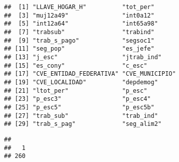 \documentclass[11pt,]{article}
\newenvironment{Shaded}{\begin{snugshade}}{\end{snugshade}}
\newcommand{\KeywordTok}[1]{\textcolor[rgb]{0.13,0.29,0.53}{\textbf{#1}}}
\newcommand{\DataTypeTok}[1]{\textcolor[rgb]{0.13,0.29,0.53}{#1}}
\newcommand{\DecValTok}[1]{\textcolor[rgb]{0.00,0.00,0.81}{#1}}
\newcommand{\StringTok}[1]{\textcolor[rgb]{0.31,0.60,0.02}{#1}}
\newcommand{\CommentTok}[1]{\textcolor[rgb]{0.56,0.35,0.01}{\textit{#1}}}
\newcommand{\OtherTok}[1]{\textcolor[rgb]{0.56,0.35,0.01}{#1}}
\newcommand{\OperatorTok}[1]{\textcolor[rgb]{0.81,0.36,0.00}{\textbf{#1}}}
\newcommand{\NormalTok}[1]{#1}
\begin{document}
\begin{Shaded}
\end{Shaded}

\begin{verbatim}
##  [1] "LLAVE_HOGAR_H"          "tot_per"               
##  [3] "muj12a49"               "int0a12"               
##  [5] "int12a64"               "int65a98"              
##  [7] "trabsub"                "trabind"               
##  [9] "trab_s_pago"            "segsoc1"               
## [11] "seg_pop"                "es_jefe"               
## [13] "j_esc"                  "jtrab_ind"             
## [15] "es_cony"                "c_esc"                 
## [17] "CVE_ENTIDAD_FEDERATIVA" "CVE_MUNICIPIO"         
## [19] "CVE_LOCALIDAD"          "depdemog"              
## [21] "ltot_per"               "p_esc"                 
## [23] "p_esc3"                 "p_esc4"                
## [25] "p_esc5"                 "p_esc5b"               
## [27] "trab_sub"               "trab_ind"              
## [29] "trab_s_pag"             "seg_alim2"
\end{verbatim}

\begin{Shaded}
\end{Shaded}

\begin{verbatim}
## 
##   1 
## 260
\end{verbatim}
\end{document}
